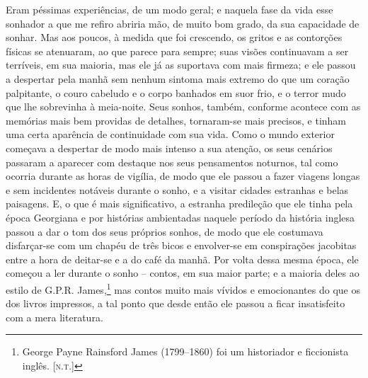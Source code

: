 Eram péssimas experiências, de um modo geral; e naquela fase da vida
esse sonhador a que me refiro abriria mão, de muito bom grado, da sua
capacidade de sonhar.  Mas aos poucos, à medida que foi crescendo, os
gritos e as contorções físicas se atenuaram, ao que parece para sempre;
suas visões continuavam a ser terríveis, em sua maioria, mas ele já as
suportava com mais firmeza; e ele passou a despertar pela manhã sem
nenhum sintoma mais extremo do que um coração palpitante, o couro
cabeludo e o corpo banhados em suor frio, e o terror mudo que lhe
sobrevinha à meia-noite.  Seus sonhos, também, conforme acontece com as
memórias mais bem providas de detalhes, tornaram-se mais precisos, e
tinham uma certa aparência de continuidade com sua vida.  Como o mundo
exterior começava a despertar de modo mais intenso a sua atenção, os
seus cenários passaram a aparecer com destaque nos seus pensamentos
noturnos, tal como ocorria durante as horas de vigília, de modo que ele
passou a fazer viagens longas e sem incidentes notáveis durante o
sonho, e a visitar cidades estranhas e belas paisagens.  E, o que é
mais significativo, a estranha predileção que ele tinha pela época
Georgiana e por histórias ambientadas naquele período da história
inglesa passou a dar o tom dos seus próprios sonhos, de modo que ele
costumava disfarçar-se com um chapéu de três bicos e envolver-se em
conspirações jacobitas entre a hora de deitar-se e a do café da manhã. 
Por volta dessa mesma época, ele começou a ler durante o sonho --
contos, em sua maior parte; e a maioria deles ao estilo de G.P.R.
James,\footnote{George Payne Rainsford 
James (1799--1860) foi um historiador e ficcionista inglês. 
[\textsc{n.t.}]} mas contos muito mais vívidos e emocionantes do que os dos
livros impressos, a tal ponto que desde então ele passou a ficar
insatisfeito com a mera literatura.

